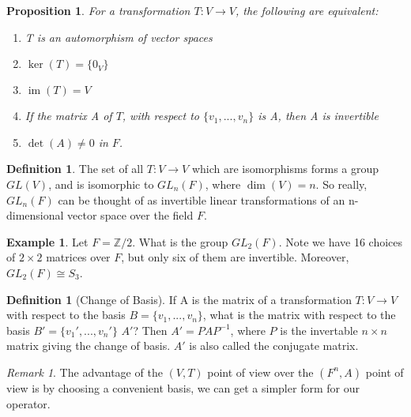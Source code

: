 \documentclass[12pt]{article}
\newtheorem{prop}[thm]{Proposition}
\theoremstyle{definition}
\newtheorem{defn}[thm]{Definition}
\newtheorem{eg}[thm]{Example}
\theoremstyle{remark}
\newtheorem{rmk}[thm]{Remark}
\numberwithin{equation}{section}
\newcommand\Z{\mathbb Z}    %
\DeclareMathOperator{\im}{im}
\begin{document}
\vspace{15pt}

\begin{prop}
        For a transformation $T:V\rightarrow V$, the following are equivalent:
        \begin{enumerate}
                \item T is an automorphism of vector spaces
                \item $\ker(T) = \{0_V\}$
                \item $\im(T) = V$
                \item If the matrix A of $T$, with respect to $\{v_1,...,v_n\}$ is A, then A is invertible 
                \item $\det(A) \neq 0$ in $F$.
        \end{enumerate}
\end{prop}


\vspace{15pt}

\begin{defn}
        The set of all $T:V\rightarrow V$ which are isomorphisms forms a group $GL(V)$, and is isomorphic to $GL_n(F)$, where $\dim(V) = n$. So really, $GL_n(F)$ can be thought of as invertible linear transformations of an n-dimensional vector space over the field $F$.
\end{defn}


\vspace{15pt}

\begin{eg}
        Let $F = \Z/2$. What is the group $GL_2(F)$. Note we have 16 choices of $2\times 2$ matrices over $F$, but only six of them are invertible. Moreover, $GL_2(F) \cong S_3$.
\end{eg}


\vspace{15pt}

\begin{defn}[Change of Basis]
        If A is the matrix of a transformation $T: V\rightarrow V$ with respect to the basis $B = \{v_1,...,v_n\}$, what is the matrix with respect to the basis $B' = \{v_1',...,v_n'\}$ $A'$? Then $A' = PAP^{-1}$, where $P$ is the invertable $n\times n$ matrix giving the change of basis.  $A'$ is also called the conjugate matrix.
\end{defn}

\vspace{15pt}

\begin{rmk}
        The advantage of the $(V,T)$ point of view over the $(F^n,A)$ point of view is by choosing a convenient basis, we can get a simpler form for our operator.
\end{rmk}
\end{document}
